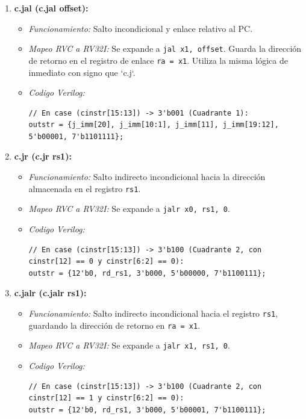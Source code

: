 \documentclass[12pt, a4paper]{article}
\begin{document}
\begin{enumerate}
    \item \textbf{c.jal (c.jal offset):}
    \begin{itemize}
        \item \textit{Funcionamiento:} Salto incondicional y enlace relativo al PC.
        \item \textit{Mapeo RVC a RV32I:} Se expande a \texttt{jal x1, offset}. Guarda la dirección de retorno en el registro de enlace \texttt{ra = x1}. Utiliza la misma lógica de inmediato con signo que `c.j`.
        \item \textit{Codigo Verilog:}
        \begin{lstlisting}[style=verilogstyle]
// En case (cinstr[15:13]) -> 3'b001 (Cuadrante 1):
outstr = {j_imm[20], j_imm[10:1], j_imm[11], j_imm[19:12], 5'b00001, 7'b1101111};
        \end{lstlisting}
    \end{itemize}

    \item \textbf{c.jr (c.jr rs1):}
    \begin{itemize}
        \item \textit{Funcionamiento:} Salto indirecto incondicional hacia la dirección almacenada en el registro \texttt{rs1}.
        \item \textit{Mapeo RVC a RV32I:} Se expande a \texttt{jalr x0, rs1, 0}.
        \item \textit{Codigo Verilog:}
        \begin{lstlisting}[style=verilogstyle]
// En case (cinstr[15:13]) -> 3'b100 (Cuadrante 2, con cinstr[12] == 0 y cinstr[6:2] == 0):
outstr = {12'b0, rd_rs1, 3'b000, 5'b00000, 7'b1100111};
        \end{lstlisting}
    \end{itemize}

    \item \textbf{c.jalr (c.jalr rs1):}
    \begin{itemize}
        \item \textit{Funcionamiento:} Salto indirecto incondicional hacia el registro \texttt{rs1}, guardando la dirección de retorno en \texttt{ra = x1}.
        \item \textit{Mapeo RVC a RV32I:} Se expande a \texttt{jalr x1, rs1, 0}.
        \item \textit{Codigo Verilog:}
        \begin{lstlisting}[style=verilogstyle]
// En case (cinstr[15:13]) -> 3'b100 (Cuadrante 2, con cinstr[12] == 1 y cinstr[6:2] == 0):
outstr = {12'b0, rd_rs1, 3'b000, 5'b00001, 7'b1100111};
        \end{lstlisting}
    \end{itemize}
\end{enumerate}
\end{document}
